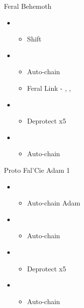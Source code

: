 
\begin{battle}{Feral Behemoth}
	\begin{flushleft}
		\begin{itemize}
			\item \sixth
			      \begin{itemize}
				      \item Shift
			      \end{itemize}
			\item \second
			      \begin{itemize}
				      \item Auto-chain
				      \item Feral Link - \circlec, \squarec, \circlec
			      \end{itemize}
			\item \third
			      \begin{itemize}
				      \item Deprotect x5
			      \end{itemize}
			\item \fifth
			      \begin{itemize}
				      \item Auto-chain
			      \end{itemize}
		\end{itemize}
	\end{flushleft}
\end{battle}

\begin{battle}{Proto Fal'Cie Adam 1}
	\begin{flushleft}
		\begin{itemize}
			\item \sixth
			      \begin{itemize}
				      \item Auto-chain Adam
			      \end{itemize}
			\item \fifth
			      \begin{itemize}
				      \item Auto-chain
			      \end{itemize}
			\item \third
			      \begin{itemize}
				      \item Deprotect x5
			      \end{itemize}
			\item \fifth
			      \begin{itemize}
				      \item Auto-chain
			      \end{itemize}
		\end{itemize}
	\end{flushleft}
\end{battle}

